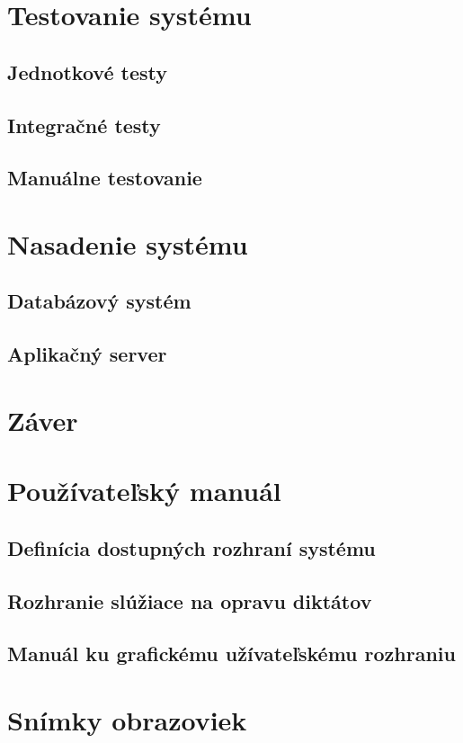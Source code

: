 \documentclass[12pt,oneside]{fithesis2}
\begin{document}
    \chapter{Testovanie systému}
      \section{Jednotkové testy}
      \section{Integračné testy}
      \section{Manuálne testovanie}
    \chapter{Nasadenie systému} \label{nasadenie}
      \section{Databázový systém}
      \section{Aplikačný server}
    \chapter{Záver}   
        
    \appendix
    \chapter{Používateľský manuál} 	  %
      \section{Definícia dostupných rozhraní systému}    
      \section{Rozhranie slúžiace na opravu diktátov} \label{navod_oprava}
      \section{Manuál ku grafickému užívateľskému rozhraniu}
    \chapter{Snímky obrazoviek}
\end{document}
